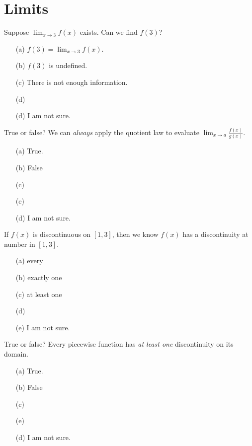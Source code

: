 \documentclass[14pt, draft]{beamer}
\newcommand{\toinstructors}[1]{{
    \scriptsize \color{magenta} {#1} \newline 
  Remove this comment by removing the draft option from \textbackslash{}documentclass.}
}
\renewcommand{\toinstructors}[1]{}
\begin{document}
\section{Limits}
\begin{frame}
  Suppose \(\lim_{x \to 3} f(x)\) exists. Can we find \(f(3)\)?
  \medskip
  \begin{itemize} \setlength\itemsep{2ex}
    \item[(a)] \(f(3) = \lim_{x \to 3} f(x)\).
    \item[(b)] \(f(3)\) is undefined.
    \item[(c)] There is not enough information.
    \item[(d)] 
    \item[(d)] I am not sure.
  \end{itemize} 
\end{frame} 

\begin{frame}
  True or false? We can \emph{always} apply the quotient law to evaluate \(\lim_{x \to a} \frac{f(x)}{g(x)}\).

  \medskip
  \begin{itemize} \setlength\itemsep{2ex}
    \item[(a)] True.
    \item[(b)] False
    \item[(c)] 
    \item[(e)] 
    \item[(d)] I am not sure.
  \end{itemize} 
\end{frame}

\begin{frame}
  If \(f(x)\) is discontinuous on \([1,3]\), then we know \(f(x)\) has a discontinuity at \underline{\hspace{1in}} number in \([1,3]\). 
  \medskip
  \begin{itemize} \setlength\itemsep{2ex}
    \item[(a)] every
    \item[(b)] exactly one
    \item[(c)] at least one
    \item[(d)] 
    \item[(e)] I am not sure.
  \end{itemize} 

  \toinstructors{Could be used as a lead-in to discuss continuity over intervals.}
\end{frame} 


\begin{frame}
  True or false? Every piecewise function has \emph{at least one} discontinuity on its domain.

  \medskip
  \begin{itemize} \setlength\itemsep{2ex}
    \item[(a)] True.
    \item[(b)] False
    \item[(c)] 
    \item[(e)] 
    \item[(d)] I am not sure.
  \end{itemize} 
\end{frame} 
\end{document}
